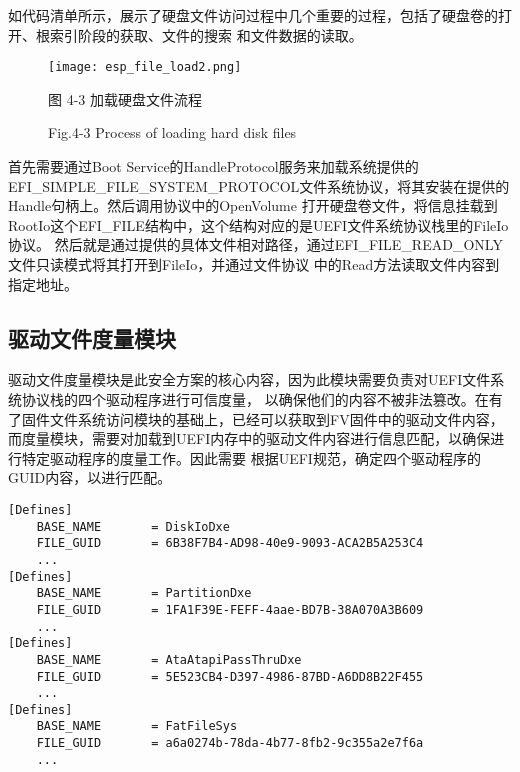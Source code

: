 如代码清单所示，展示了硬盘文件访问过程中几个重要的过程，包括了硬盘卷的打开、根索引阶段的获取、文件的搜索
和文件数据的读取。

\begin{figure}[htb]
    \vspace{0cm}   
    \setlength{\abovecaptionskip}{0.3cm}
	\centering
    \texttt{[image: esp\_file\_load2.png]}
    \caption*{图 4-3 加载硬盘文件流程}
    \setlength{\belowcaptionskip}{-0.5cm}
    \caption*{Fig.4-3 Process of loading hard disk files}
\end{figure}

首先需要通过Boot Service的HandleProtocol服务来加载系统提供的
EFI\_SIMPLE\_FILE\_SYSTEM\_PROTOCOL文件系统协议，将其安装在提供的Handle句柄上。然后调用协议中的OpenVolume
打开硬盘卷文件，将信息挂载到RootIo这个EFI\_FILE结构中，这个结构对应的是UEFI文件系统协议栈里的FileIo协议。
然后就是通过提供的具体文件相对路径，通过EFI\_FILE\_READ\_ONLY文件只读模式将其打开到FileIo，并通过文件协议
中的Read方法读取文件内容到指定地址。

\subsection{驱动文件度量模块}
驱动文件度量模块是此安全方案的核心内容，因为此模块需要负责对UEFI文件系统协议栈的四个驱动程序进行可信度量，
以确保他们的内容不被非法篡改。在有了固件文件系统访问模块的基础上，已经可以获取到FV固件中的驱动文件内容，
而度量模块，需要对加载到UEFI内存中的驱动文件内容进行信息匹配，以确保进行特定驱动程序的度量工作。因此需要
根据UEFI规范，确定四个驱动程序的GUID内容，以进行匹配。

\begin{lstlisting}
[Defines]
    BASE_NAME       = DiskIoDxe
    FILE_GUID       = 6B38F7B4-AD98-40e9-9093-ACA2B5A253C4
    ...
[Defines]
    BASE_NAME       = PartitionDxe
    FILE_GUID       = 1FA1F39E-FEFF-4aae-BD7B-38A070A3B609
    ...
[Defines]
    BASE_NAME       = AtaAtapiPassThruDxe
    FILE_GUID       = 5E523CB4-D397-4986-87BD-A6DD8B22F455
    ...
[Defines]
    BASE_NAME       = FatFileSys
    FILE_GUID       = a6a0274b-78da-4b77-8fb2-9c355a2e7f6a
    ...
\end{lstlisting}

